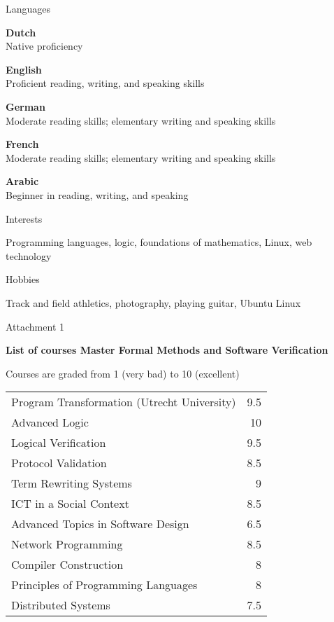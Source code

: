 \documentclass[a4paper,11pt]{article}
\begin{document}
\begin{cv}{}
\begin{cvlist}{Languages}
\item
  {\bf Dutch}\\
  Native proficiency
\item
  {\bf English}\\
  Proficient reading, writing, and speaking skills
\item
  {\bf German}\\
  Moderate reading skills; elementary writing and speaking skills
\item
  {\bf French}\\
  Moderate reading skills; elementary writing and speaking skills
\item
  {\bf Arabic}\\
  Beginner in reading, writing, and speaking
\end{cvlist}


\begin{cvlist}{Interests}
\item Programming languages, logic, foundations of mathematics, Linux, web technology
\end{cvlist}


\begin{cvlist}{Hobbies}
\item Track and field athletics, photography, playing guitar, Ubuntu Linux
\end{cvlist}


\pagebreak


\begin{cvlist}{Attachment 1}
  \item {\bf List of courses Master Formal Methods and Software Verification}
  \item Courses are graded from 1 (very bad) to 10 (excellent)
  \item
  \begin{tabular}{p{23em}d}
    Program Transformation (Utrecht University) & 9.5\\
    Advanced Logic & 10\\
    Logical Verification & 9.5\\
    Protocol Validation & 8.5\\
    Term Rewriting Systems & 9\\
    ICT in a Social Context & 8.5\\
    Advanced Topics in Software Design & 6.5\\
    Network Programming & 8.5\\
    Compiler Construction & 8\\
    Principles of Programming Languages & 8\\
    Distributed Systems & 7.5
  \end{tabular}
\end{cvlist}



\end{cv}
\end{document}
